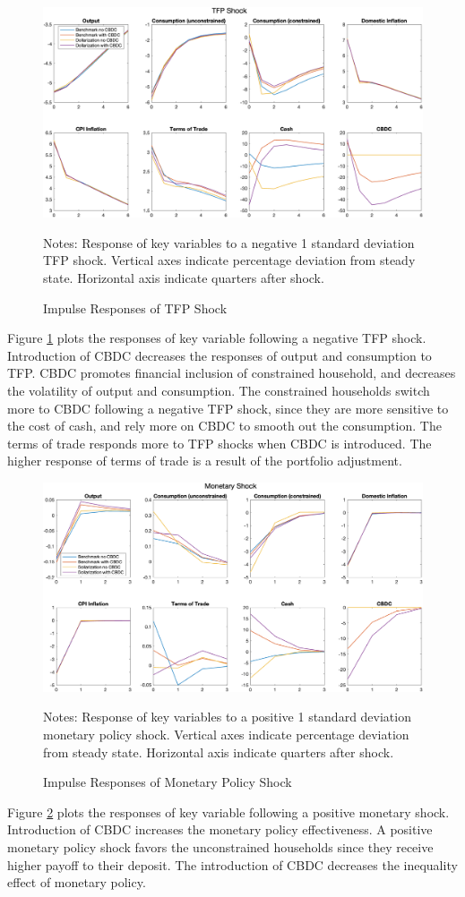 \documentclass[12pt]{article}
\begin{document}
\begin{figure}[h!]
\includegraphics[width=\textwidth]{TFP}
\caption{Impulse Responses of TFP Shock}
\label{IRF1}
\scriptsize{Notes: Response of key variables to a negative 1 standard deviation TFP shock. Vertical axes indicate percentage deviation from steady state. Horizontal axis indicate quarters after shock. }
\end{figure}
Figure \ref{IRF1} plots the responses of key variable following a negative TFP shock. Introduction of CBDC decreases the responses of output and consumption to TFP. CBDC promotes financial inclusion of constrained household, and decreases the volatility of output and consumption. The constrained households switch more to CBDC following a negative TFP shock, since they are more sensitive to the cost of cash, and rely more on CBDC to smooth out the consumption. The terms of trade responds more to TFP shocks when CBDC is introduced. The higher response of terms of trade is a result of the portfolio adjustment. 

\begin{figure}[h!]
\includegraphics[width=\textwidth]{Monetary}
\caption{Impulse Responses of Monetary Policy Shock}
\label{IRF2}
\scriptsize{Notes: Response of key variables to a positive 1 standard deviation monetary policy shock. Vertical axes indicate percentage deviation from steady state. Horizontal axis indicate quarters after shock. }
\end{figure}
Figure \ref{IRF2} plots the responses of key variable following a positive monetary shock. Introduction of CBDC increases the monetary policy effectiveness. A positive monetary policy shock favors the unconstrained households since they receive higher payoff to their deposit. The introduction of CBDC decreases the inequality effect of monetary policy. 
\end{document}
